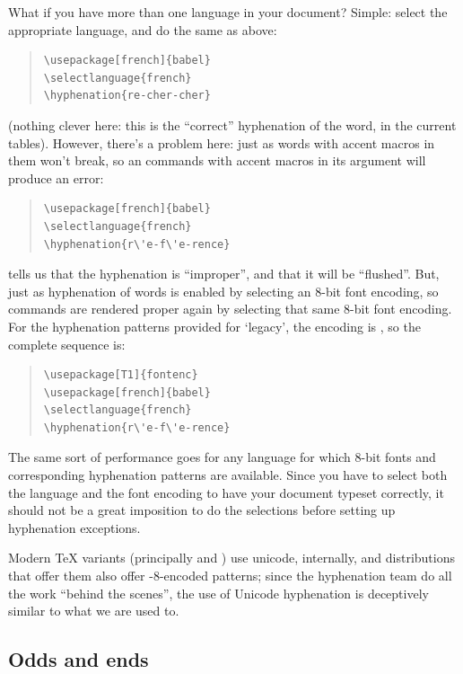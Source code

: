 What if you have more than one language in your document?  Simple:
select the appropriate language, and do the same as above:
\begin{quote}
\begin{verbatim}
\usepackage[french]{babel}
\selectlanguage{french}
\hyphenation{re-cher-cher}
\end{verbatim}
\end{quote}
(nothing clever here: this is the ``correct'' hyphenation of the word,
in the current tables).  However, there's a problem here: just as
words with accent macros in them won't break, so an 
commands with accent macros in its argument will produce an error:
\begin{quote}
\begin{verbatim}
\usepackage[french]{babel}
\selectlanguage{french}
\hyphenation{r\'e-f\'e-rence}
\end{verbatim}
\end{quote}
tells us that the hyphenation is ``improper'', and that it will be ``flushed''.
But, just as hyphenation of words is enabled by selecting an 8-bit
font encoding, so  commands are rendered proper again
by selecting that same 8-bit font encoding.  For the hyphenation
patterns provided for `legacy', the encoding is
, so the complete sequence is:
\begin{quote}
\begin{verbatim}
\usepackage[T1]{fontenc}
\usepackage[french]{babel}
\selectlanguage{french}
\hyphenation{r\'e-f\'e-rence}
\end{verbatim}
\end{quote}
The same sort of performance goes for any language for which 8-bit
fonts and corresponding hyphenation patterns are available.  Since you
have to select both the language and the font encoding to have your
document typeset correctly, it should not be a great imposition to do
the selections before setting up hyphenation exceptions.

Modern TeX variants (principally \xetex{} and \LuaTeX{}) use unicode,
internally, and distributions that offer them also offer
-8-encoded patterns; since the hyphenation team do all the
work ``behind the scenes'', the use of Unicode hyphenation is
deceptively similar to what we are used to.

\subsection{Odds and ends}

